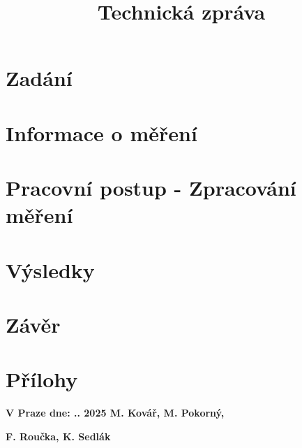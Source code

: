 \documentclass[12pt, a4paper]{article}
\title{Technická zpráva}
\date{}
\begin{document}
    \pagestyle{empty}
    
    \pagestyle{plain}
    \setcounter{page}{1}
    
    \maketitle
    
    \section{Zadání}
    

    \newpage

    \section{Informace o měření}
    

    \newpage



    \section{Pracovní postup - Zpracování měření}
    

    \newpage
    
    \section{Výsledky}
    

    \newpage

    \section{Závěr}
     

    \section{Přílohy}
    
    
\vspace*{\fill}
\textbf{V Praze dne: .. 2025\hspace{5cm} M. Kovář, M. Pokorný,}

\textbf{\hspace{9.3cm}F. Roučka, K. Sedlák}

\newpage

\end{document}
